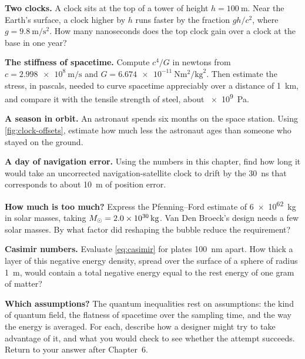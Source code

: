 \begin{problems}
\item {} \textbf{Two clocks.} A clock sits at the top of a tower of height
  $h = \SI{100}{\metre}$. Near the Earth's surface, a clock higher by $h$ runs
  faster by the fraction $gh/c^{2}$, where
  $g = \SI{9.8}{\metre\per\second\squared}$. How many nanoseconds does the
  top clock gain over a clock at the base in one year?
\item {} \textbf{The stiffness of spacetime.} Compute $c^{4}/G$ in newtons
  from $c = \SI{2.998e8}{\metre\per\second}$ and
  $G = \SI{6.674e-11}{\newton\metre\squared\per\kilogram\squared}$. Then
  estimate the stress, in pascals, needed to curve spacetime appreciably over a
  distance of \SI{1}{\kilo\metre}, and compare it with the tensile strength of
  steel, about \SI{e9}{\pascal}.
\item {} \textbf{A season in orbit.} An astronaut spends six months on the
  space station. Using \cref{fig:clock-offsets}, estimate how much less the
  astronaut ages than someone who stayed on the ground.
\item {} \textbf{A day of navigation error.} Using the numbers in this
  chapter, find how long it would take an uncorrected navigation-satellite
  clock to drift by the \SI{30}{\nano\second} that corresponds to about
  \SI{10}{\metre} of position error.
\item {} \textbf{How much is too much?} Express the Pfenning--Ford estimate
  of \SI{6e62}{\kilogram} in solar masses, taking
  $M_{\odot} = \SI{2.0e30}{\kilogram}$. Van Den Broeck's design needs a few solar
  masses. By what factor did reshaping the bubble reduce the requirement?
\item {} \textbf{Casimir numbers.} Evaluate \cref{eq:casimir} for plates
  \SI{100}{\nano\metre} apart. How thick a layer of this negative energy
  density, spread over the surface of a sphere of radius \SI{1}{\metre}, would
  contain a total negative energy equal to the rest energy of one gram of
  matter?
\item {} \textbf{Which assumptions?} The quantum inequalities rest on
  assumptions: the kind of quantum field, the flatness of spacetime over the
  sampling time, and the way the energy is averaged. For each, describe how a
  designer might try to take advantage of it, and what you would check to see
  whether the attempt succeeds. Return to your answer after Chapter~6.
\end{problems}

